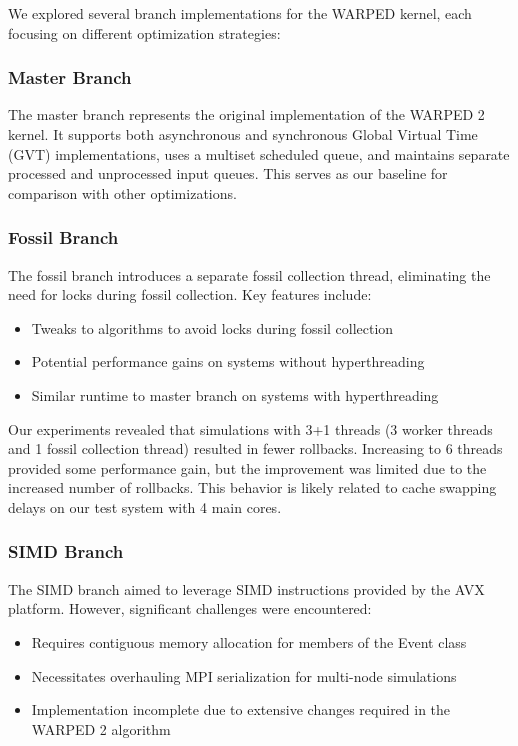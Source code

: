 We explored several branch implementations for the WARPED kernel, each focusing on different optimization strategies:

\subsubsection{Master Branch}

The master branch represents the original implementation of the WARPED 2 kernel. It supports both asynchronous and synchronous Global Virtual Time (GVT) implementations, uses a multiset scheduled queue, and maintains separate processed and unprocessed input queues. This serves as our baseline for comparison with other optimizations.

\subsubsection{Fossil Branch}

The fossil branch introduces a separate fossil collection thread, eliminating the need for locks during fossil collection. Key features include:

\begin{itemize}
    \item Tweaks to algorithms to avoid locks during fossil collection
    \item Potential performance gains on systems without hyperthreading
    \item Similar runtime to master branch on systems with hyperthreading
\end{itemize}

Our experiments revealed that simulations with 3+1 threads (3 worker threads and 1 fossil collection thread) resulted in fewer rollbacks. Increasing to 6 threads provided some performance gain, but the improvement was limited due to the increased number of rollbacks. This behavior is likely related to cache swapping delays on our test system with 4 main cores.

\subsubsection{SIMD Branch}

The SIMD branch aimed to leverage SIMD instructions provided by the AVX platform. However, significant challenges were encountered:

\begin{itemize}
    \item Requires contiguous memory allocation for members of the Event class
    \item Necessitates overhauling MPI serialization for multi-node simulations
    \item Implementation incomplete due to extensive changes required in the WARPED 2 algorithm
\end{itemize}

